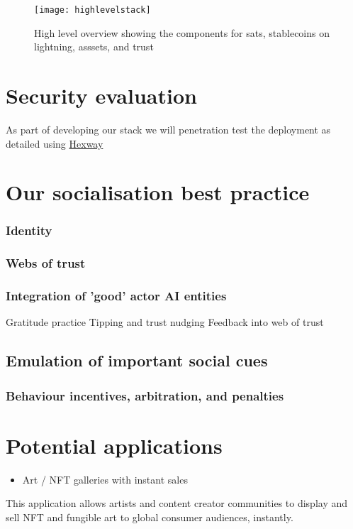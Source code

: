 \documentclass[
	12pt, %
	fleqn, %
	a4paper, %
	oneside, %
]{LegrandOrangeBook}
\begin{document}
\begin{figure*}[ht]\centering 	\texttt{[image: highlevelstack]}
	\caption{High level overview showing the components for sats, stablecoins on lightning, asssets, and trust}
	\label{fig:highlevelstack}
\end{figure*}

\section{Security evaluation}
As part of developing our stack we will penetration test the deployment as detailed using \href{https://hexway.io/}{Hexway}
\section{Our socialisation best practice}
\subsubsection{Identity}
\subsubsection{Webs of trust}
\subsubsection{Integration of 'good' actor AI entities}
Gratitude practice
Tipping and trust nudging
Feedback into web of trust
\subsection{Emulation of important social cues}
\subsubsection{Behaviour incentives, arbitration, and penalties}

\section{Potential applications }
\begin{itemize}
\item Art / NFT galleries with instant sales
\end{itemize}

This application allows artists and content creator communities to
display and sell NFT and fungible art to global consumer audiences,
instantly.
\end{document}
